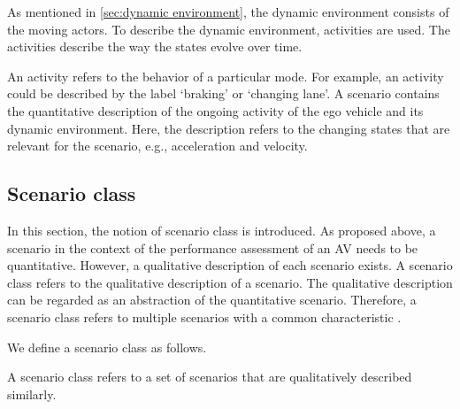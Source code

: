As mentioned in \cref{sec:dynamic environment}, the dynamic environment consists of the moving actors. To describe the dynamic environment, activities are used. The activities describe the way the states evolve over time. 

An activity refers to the behavior of a particular mode. For example, an activity could be described by the label `braking' or `changing lane'.
A scenario contains the quantitative description of the ongoing activity of the ego vehicle and its dynamic environment. Here, the description refers to the changing states that are relevant for the scenario, e.g., acceleration and velocity. 




\subsection{Scenario class}
\label{sec:scenario class}

In this section, the notion of scenario class is introduced. As proposed above, a scenario in the context of the performance assessment of an AV needs to be quantitative. However, a qualitative description of each scenario exists. 
A scenario class refers to the qualitative description of a scenario.
The qualitative description can be regarded as an abstraction of the quantitative scenario. Therefore, a scenario class refers to multiple scenarios with a common characteristic \cite{elrofai2018scenario}.

We define a scenario class as follows.
\begin{definition} \label{def:scenario class}
	A scenario class refers to a set of scenarios that are qualitatively described similarly.
\end{definition}



